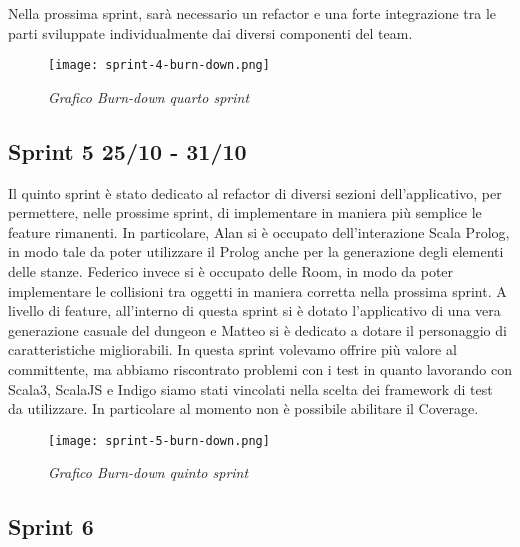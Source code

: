 Nella prossima sprint, sarà necessario un refactor e una forte integrazione tra le parti sviluppate individualmente dai diversi componenti del team.

\begin{figure}[!hbt]
    \centering
    \texttt{[image: sprint-4-burn-down.png]}
    \caption{\textit{Grafico Burn-down quarto sprint}} 
\end{figure}

\subsection{Sprint 5 25/10 - 31/10}
Il quinto sprint è stato dedicato al refactor di diversi sezioni dell'applicativo, per permettere, nelle prossime sprint, di implementare in maniera più semplice le feature rimanenti.  
In particolare, Alan si è occupato dell'interazione Scala Prolog, in modo tale da poter utilizzare il Prolog anche per la generazione degli elementi delle stanze. Federico invece si è occupato delle Room, in modo da poter implementare le collisioni tra oggetti in maniera corretta nella prossima sprint. 
A livello di feature, all'interno di questa sprint si è dotato l'applicativo di una vera generazione casuale del dungeon e Matteo si è dedicato a dotare il personaggio di caratteristiche migliorabili. 
In questa sprint volevamo offrire più valore al committente, ma abbiamo riscontrato problemi con i test in quanto lavorando con Scala3, ScalaJS e Indigo siamo stati vincolati nella scelta dei framework di test da utilizzare. In particolare al momento non è possibile abilitare il Coverage.


\begin{figure}[!hbt]
    \centering
    \texttt{[image: sprint-5-burn-down.png]}
    \caption{\textit{Grafico Burn-down quinto sprint}} 
\end{figure}

\subsection{Sprint 6}